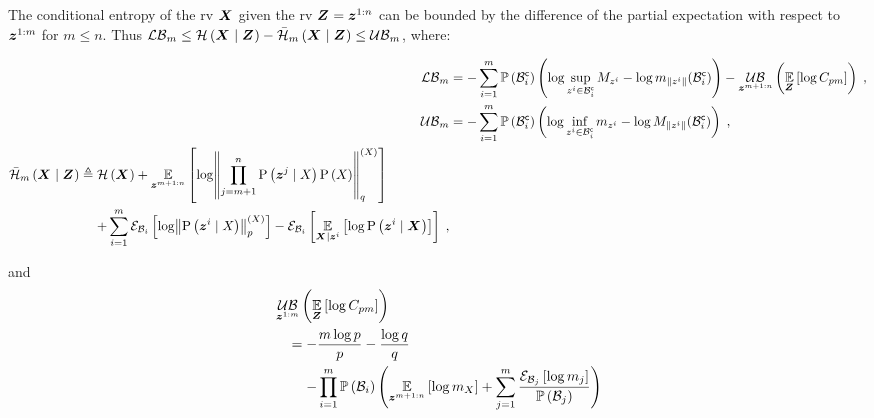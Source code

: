 \begin{proposition}
	\label{thm:entropy_high_dim_bounds}
	The conditional entropy of the \gls{rv} $\boldsymbol X_{}$ given the \gls{rv} $\boldsymbol Z_{}=\boldsymbol z_{}^{1:n}$ can be bounded by the difference of the partial expectation with respect to $\boldsymbol z_{}^{1:m}$ for $m\leq n$. Thus $\operatorname*{\mathcal{LB}}_m\leq\mathcal{H}\left({\boldsymbol X_{}}\mid{\ensuremath{\boldsymbol Z_{}}}\right)-\bar{\mathcal{H}}_{m}\left({\boldsymbol X_{}}\mid{\ensuremath{\boldsymbol Z_{}}}\right)\leq\operatorname*{\mathcal{UB}}_m$, where:
	\begin{small}
		\begin{subequations}
			\begin{align}
				\lowerbound\nolimits_m & =-\sum_{i=1}^m\measure{\stcompI{\subSpace}{i}}\left(\log\sup_{\observation{}{i}\in\stcompI{\subSpace}{i}}M_{\observation{}{i}}-\log m_{\norm{\observation{}{i}}}(\stcompI{\subSpace}{i})\right)-\upperbound_{\observationRV{}{m+1:n}}\left(\expectation{\log C_{pm}}{\observationsRV{}}\right)\;,
				\\
				\upperbound\nolimits_m  & =-\sum_{i=1}^m\measure{\stcompI{\subSpace}{i}}\left(\log\inf_{\observation{}{i}\in\stcompI{\subSpace}{i}}m_{\observation{}{i}}-\log M_{\norm{\observation{}{i}}}(\stcompI{\subSpace}{i})\right)\;,\\
				\begin{split} \simplecondEntropy{\statesRV{}}{\observationsRV{}}{m}&\triangleq\entropy{\statesRV{}}+\expectation{\log\pnorm{\prod_{j=m+1}^n\probcond{\observationRV{}{j}}{\states{}}\prob{\states{}}}{q}{\states{}}}{\observationRV{}{m+1:n}}                    \\
					&\phantomeq+\sum_{i=1}^m\partialexpectation{\log\pnorm{\probcond{\observationRV{}{i}}{\states{}}}{p}{\states{}}}{\subSpace_i}-\partialexpectation{\expectation{\log\probcond{\observationRV{}{i}}{\statesRV{}}}{\statesRV{}\mid\observationRV{}{i}}}{\subSpace_i}\;,
				\end{split}
			\end{align}
		\end{subequations}
	\end{small}
	and
	\begin{equation}
		\begin{split}
			& \upperbound_{\observationRV{}{1:m}}\left(\expectation{\log C_{pm}}{\observationsRV{}}\right)\\
			& \quad=-\frac{m\log p}{p}-\frac{\log q}{q}\\
			& \quad\phantomeq-\prod_{i=1}^m\measure{\subSpace_i}\Biggl(\expectation{\log m_{\states{}}}{\observationRV{}{m+1:n}}+\sum_{j=1}^m\frac{\partialexpectation{\log m_j}{\subSpace_j}}{\measure{\subSpace_j}}\Biggr) \\

\end{split}
\end{equation}
\end{proposition}
